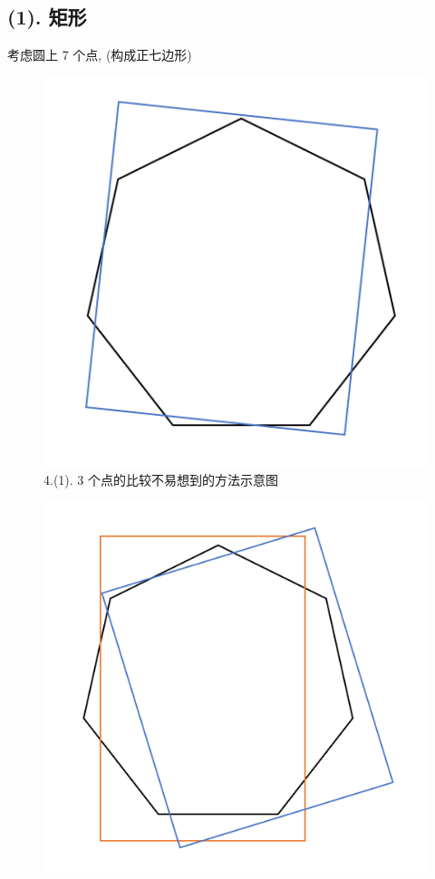 \documentclass[UTF8]{article}
\begin{document}
\subsection*{(1). 矩形}
\noindent 考虑圆上 7 个点, (构成正七边形)
\begin{center}
\begin{minipage}{\linewidth/4}
\begin{figure}[H]
	\centering
	\includegraphics[width=\linewidth]{image/4.1.3.png}
	\caption{4.(1). 3 个点的比较不易想到的方法示意图}
\end{figure}
\end{minipage}
\begin{minipage}{\linewidth/4}
\begin{figure}[H]
	\centering
	\includegraphics[width=\linewidth]{image/4.1.4.png}

\end{figure}
\end{minipage}
\end{center}
\end{document}
